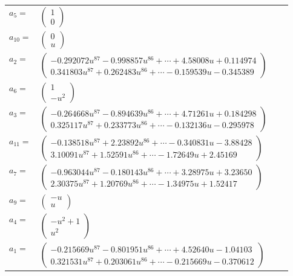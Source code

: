 \documentclass[1p]{elsarticle_modified}
\theoremstyle{definition}
\begin{document}
\begin{tabular}{m{7pt} m{180pt} m{7pt} m{180pt} }
\flushright $a_{5}=$&$\begin{pmatrix}1\\0\end{pmatrix}$ \\
\flushright $a_{10}=$&$\begin{pmatrix}0\\u\end{pmatrix}$ \\
\flushright $a_{2}=$&$\begin{pmatrix}-0.292072 u^{87}-0.998857 u^{86}+\cdots+4.58008 u+0.114974\\0.341803 u^{87}+0.262483 u^{86}+\cdots-0.159539 u-0.345389\end{pmatrix}$ \\
\flushright $a_{6}=$&$\begin{pmatrix}1\\- u^2\end{pmatrix}$ \\
\flushright $a_{3}=$&$\begin{pmatrix}-0.264668 u^{87}-0.894639 u^{86}+\cdots+4.71261 u+0.184298\\0.325117 u^{87}+0.233773 u^{86}+\cdots-0.132136 u-0.295978\end{pmatrix}$ \\
\flushright $a_{11}=$&$\begin{pmatrix}-0.138518 u^{87}+2.23892 u^{86}+\cdots-0.340831 u-3.88428\\3.10091 u^{87}+1.52591 u^{86}+\cdots-1.72649 u+2.45169\end{pmatrix}$ \\
\flushright $a_{7}=$&$\begin{pmatrix}-0.963044 u^{87}-0.180143 u^{86}+\cdots+3.28975 u+3.23650\\2.30375 u^{87}+1.20769 u^{86}+\cdots-1.34975 u+1.52417\end{pmatrix}$ \\
\flushright $a_{9}=$&$\begin{pmatrix}- u\\u\end{pmatrix}$ \\
\flushright $a_{4}=$&$\begin{pmatrix}- u^2+1\\u^2\end{pmatrix}$ \\
\flushright $a_{1}=$&$\begin{pmatrix}-0.215669 u^{87}-0.801951 u^{86}+\cdots+4.52640 u-1.04103\\0.321531 u^{87}+0.203061 u^{86}+\cdots-0.215669 u-0.370612\end{pmatrix}$ \\

\end{tabular}
\end{document}
